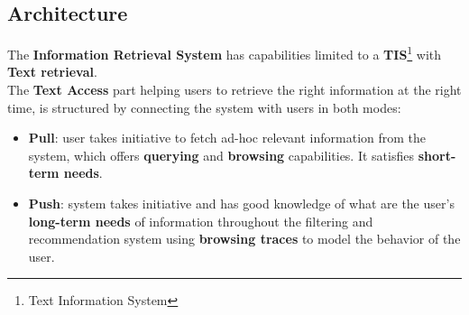 \documentclass[12pt]{spieman}  %
\begin{document}
\begin{spacing}{1}
    \section{Architecture}\label{sec:architecture}

    The \textbf{Information Retrieval System} has capabilities limited to a
    \textbf{TIS}\footnote{Text Information System}
    with \textbf{Text retrieval}.\\
    The \textbf{Text Access} part helping users to retrieve the right information at the right time,
    is structured by connecting the system with users in both modes:
    \begin{itemize}
        \item \textbf{Pull}: user takes initiative to fetch ad-hoc relevant information from the system,
              which offers \textbf{querying} and \textbf{browsing} capabilities.
              It satisfies \textbf{short-term needs}.
        \item \textbf{Push}: system takes initiative and has good knowledge of what are the user's
              \textbf{long-term needs} of information throughout the filtering and recommendation system
              using \textbf{browsing traces} to model the behavior of the user.
    \end{itemize}


\end{spacing}
\end{document}
